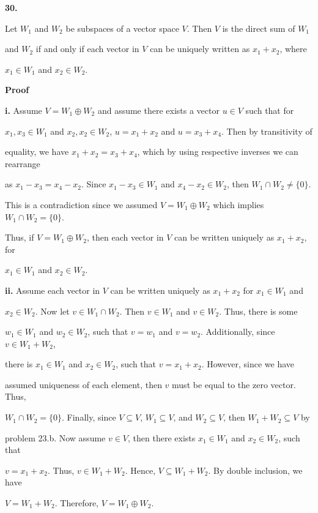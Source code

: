 \documentclass[12pt, a4paper]{article}
\begin{document}
\newpage

\noindent\textbf{30.}

\vspace{4mm}

\par Let $W_1$ and $W_2$ be subspaces of a vector space $V$. Then $V$ is the direct sum of $W_1$\par and $W_2$ if and only if each vector in $V$ can be uniquely written as $x_1+x_2$, where\par $x_1\in W_1$ and $x_2\in W_2$.\par

\vspace{4mm}

\textbf{Proof}\par

\vspace{2mm}

\par\hspace{4mm}\textbf{i.} Assume $V=W_1\oplus W_2$ and assume there exists a vector $u\in V$ such that for\par $x_1,x_3\in W_1$ and $x_2,x_2\in W_2$, $u=x_1+x_2$ and $u=x_3+x_4$. Then by transitivity of\par equality, we have $x_1+x_2=x_3+x_4$, which by using respective inverses we can rearrange\par as $x_1-x_3=x_4-x_2$. Since $x_1-x_3\in W_1$ and $x_4-x_2\in W_2$, then $W_1\cap W_2\neq\{0\}$.\par This is a contradiction since we assumed $V=W_1\oplus W_2$ which implies $W_1\cap W_2=\{0\}$.\par Thus, if $V=W_1\oplus W_2$, then each vector in $V$ can be written uniquely as $x_1+x_2$, for\par $x_1\in W_1$ and $x_2\in W_2$.

\vspace{4mm}

\par\hspace{4mm}\textbf{ii.} Assume each vector in $V$ can be written uniquely as $x_1+x_2$ for $x_1\in W_1$ and\par $x_2\in W_2$. Now let $v\in W_1\cap W_2$. Then $v\in W_1$ and $v\in W_2$. Thus, there is some\par $w_1\in W_1$ and $w_2\in W_2$, such that $v=w_1$ and $v=w_2$. Additionally, since $v\in W_1+W_2$,\par there is $x_1\in W_1$ and $x_2\in W_2$, such that $v=x_1+x_2$. However, since we have\par assumed uniqueness of each element, then $v$ must be equal to the zero vector. Thus,\par $W_1\cap W_2=\{0\}$. Finally, since $V\subseteq V$, $W_1\subseteq V$, and $W_2\subseteq V$, then $W_1+W_2\subseteq V$ by\par problem 23.b. Now assume $v\in V$, then there exists $x_1\in W_1$ and $x_2\in W_2$, such that\par $v=x_1+x_2$. Thus, $v\in W_1+W_2$. Hence, $V\subseteq W_1+W_2$. By double inclusion, we have\par $V=W_1+W_2$. Therefore, $V=W_1\oplus W_2$.\hspace{76mm}\blacksquare
\end{document}
